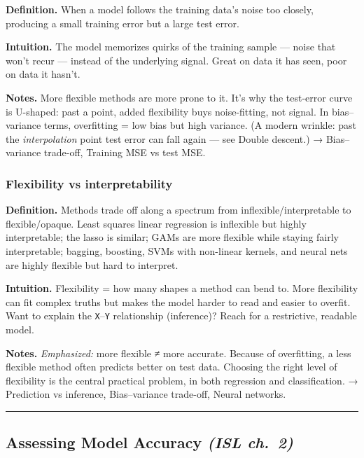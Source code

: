 \documentclass[
  10pt,
  letterpaper,
  onecolumn]{article}
\begin{document}
\textbf{Definition.} When a model follows the training data's noise too
closely, producing a small training error but a large test error.

\textbf{Intuition.} The model memorizes quirks of the training sample
--- noise that won't recur --- instead of the underlying signal. Great
on data it has seen, poor on data it hasn't.

\textbf{Notes.} More flexible methods are more prone to it. It's why the
test-error curve is U-shaped: past a point, added flexibility buys
noise-fitting, not signal. In bias--variance terms, overfitting = low
bias but high variance. (A modern wrinkle: past the \emph{interpolation}
point test error can fall again --- see Double descent.) →
Bias--variance trade-off, Training MSE vs test MSE.

\hypertarget{flexibility-vs-interpretability}{%
\subsubsection{Flexibility vs
interpretability}\label{flexibility-vs-interpretability}}

\textbf{Definition.} Methods trade off along a spectrum from
inflexible/interpretable to flexible/opaque. Least squares linear
regression is inflexible but highly interpretable; the lasso is similar;
GAMs are more flexible while staying fairly interpretable; bagging,
boosting, SVMs with non-linear kernels, and neural nets are highly
flexible but hard to interpret.

\textbf{Intuition.} Flexibility = how many shapes a method can bend to.
More flexibility can fit complex truths but makes the model harder to
read and easier to overfit. Want to explain the \texttt{X}--\texttt{Y}
relationship (inference)? Reach for a restrictive, readable model.

\textbf{Notes.} \emph{Emphasized:} more flexible ≠ more accurate.
Because of overfitting, a less flexible method often predicts better on
test data. Choosing the right level of flexibility is the central
practical problem, in both regression and classification. → Prediction
vs inference, Bias--variance trade-off, Neural networks.

\begin{center}\rule{0.5\linewidth}{0.5pt}\end{center}

\hypertarget{assessing-model-accuracy-isl-ch.-2}{%
\subsection{\texorpdfstring{Assessing Model Accuracy \emph{(ISL
ch.~2)}}{Assessing Model Accuracy (ISL ch.~2)}}\label{assessing-model-accuracy-isl-ch.-2}}
\end{document}
